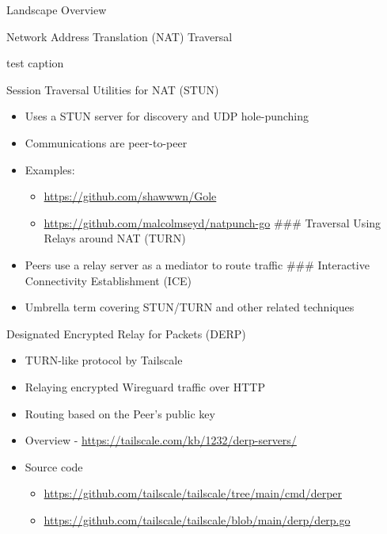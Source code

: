 \begin{frame}[fragile]{Landscape Overview}
\begin{block}{Network Address Translation (NAT) Traversal}
\begin{block}{test caption}
\protect\hypertarget{test}{}
\end{block}

\begin{block}{Session Traversal Utilities for NAT (STUN)}
\protect\hypertarget{session-traversal-utilities-for-nat-stun}{}
\begin{itemize}
\tightlist
\item
  Uses a STUN server for discovery and UDP hole-punching
\item
  Communications are peer-to-peer
\item
  Examples:

  \begin{itemize}
  \tightlist
  \item
    \url{https://github.com/shawwwn/Gole}
  \item
    \url{https://github.com/malcolmseyd/natpunch-go} \#\#\# Traversal
    Using Relays around NAT (TURN)
  \end{itemize}
\item
  Peers use a relay server as a mediator to route traffic \#\#\#
  Interactive Connectivity Establishment (ICE)
\item
  Umbrella term covering STUN/TURN and other related techniques
\end{itemize}
\end{block}

\begin{block}{Designated Encrypted Relay for Packets (DERP)}
\protect\hypertarget{designated-encrypted-relay-for-packets-derp}{}
\begin{itemize}
\tightlist
\item
  TURN-like protocol by Tailscale
\item
  Relaying encrypted Wireguard traffic over HTTP
\item
  Routing based on the Peer's public key
\item
  Overview - \url{https://tailscale.com/kb/1232/derp-servers/}
\item
  Source code

  \begin{itemize}
  \tightlist
  \item
    \url{https://github.com/tailscale/tailscale/tree/main/cmd/derper}
  \item
    \url{https://github.com/tailscale/tailscale/blob/main/derp/derp.go}
  \end{itemize}
\end{itemize}
\end{block}
\end{block}


\end{frame}
